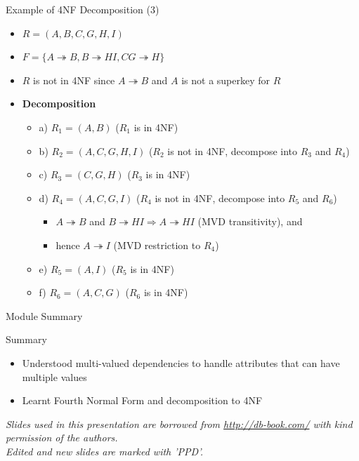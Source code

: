 \documentclass[aspectratio=169, xcolor=dvipsnames]{beamer}
\begin{document}
\begin{frame}{Example of 4NF Decomposition (3)}
    \begin{itemize}[<+->]
        \item $R = (A, B, C, G, H, I)$
        \item $F = \{A \twoheadrightarrow B, B \twoheadrightarrow HI, CG \twoheadrightarrow H\}$
        \item $R$ is not in 4NF since $A \twoheadrightarrow B$ and $A$ is not a superkey for $R$
        \item \textbf{Decomposition}
        \begin{itemize}
            \item[$\triangleright$] a) $R_1 = (A, B)$ ($R_1$ is in 4NF)
            \item[$\triangleright$] b) $R_2 = (A, C, G, H, I)$ ($R_2$ is not in 4NF, decompose into $R_3$ and $R_4$)
            \item[$\triangleright$] c) $R_3 = (C, G, H)$ ($R_3$ is in 4NF)
            \item[$\triangleright$] d) $R_4 = (A, C, G, I)$ ($R_4$ is not in 4NF, decompose into $R_5$ and $R_6$)
            \begin{itemize}
                \item $A \twoheadrightarrow B$ and $B \twoheadrightarrow HI \Rightarrow A \twoheadrightarrow HI$ (MVD transitivity), and
                \item hence $A \twoheadrightarrow I$ (MVD restriction to $R_4$)
            \end{itemize}
            \item[$\triangleright$] e) $R_5 = (A, I)$ ($R_5$ is in 4NF)
            \item[$\triangleright$] f) $R_6 = (A, C, G)$ ($R_6$ is in 4NF)
        \end{itemize}
    \end{itemize}
\end{frame}

\begin{frame}{Module Summary}
    \begin{block}{Summary}
        \begin{itemize}[<+->]
            \item Understood multi-valued dependencies to handle attributes that can have multiple values
            \item Learnt Fourth Normal Form and decomposition to 4NF
        \end{itemize}
    \end{block}
    \vspace{2em}
    \begin{center}
    \small \textit{Slides used in this presentation are borrowed from \url{http://db-book.com/} with kind permission of the authors.} \\
    \small \textit{Edited and new slides are marked with 'PPD'.}
    \end{center}
\end{frame}
\end{document}
